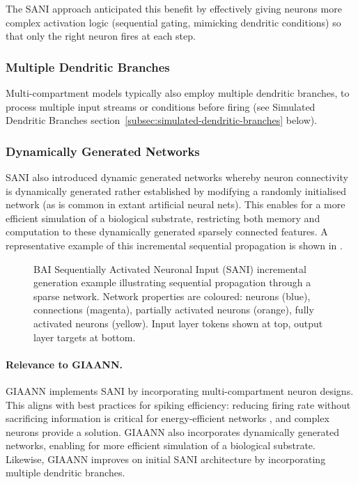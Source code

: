 The SANI approach anticipated this benefit by effectively giving neurons more complex activation logic (sequential gating, mimicking dendritic conditions) so that only the right neuron fires at each step.

\subsubsection{Multiple Dendritic Branches}

Multi-compartment models typically also employ multiple dendritic branches, to process multiple input streams or conditions before firing \citep{leugering2020spiking, leugering2023dendritic} (see Simulated Dendritic Branches section~\ref{subsec:simulated-dendritic-branches} below).

\subsubsection{Dynamically Generated Networks}

SANI also introduced dynamic generated networks \citep{bairesearch2022SANI, bairesearch2025EISANIpt} whereby neuron connectivity is dynamically generated rather established by modifying a randomly initialised network (as is common in extant artificial neural nets). This enables for a more efficient simulation of a biological substrate, restricting both memory and computation to these dynamically generated sparsely connected features.
A representative example of this incremental sequential propagation is shown in .

\begin{figure}[htbp]
\centering

\caption{BAI Sequentially Activated Neuronal Input (SANI) incremental generation example illustrating sequential propagation through a sparse network. Network properties are coloured: neurons (blue), connections (magenta), partially activated neurons (orange), fully activated neurons (yellow). Input layer tokens shown at top, output layer targets at bottom.}
\label{fig:intro-sani-sequential-propagation}
\end{figure}

\paragraph{Relevance to GIAANN.}
GIAANN implements SANI by incorporating multi-compartment neuron designs.
This aligns with best practices for spiking efficiency: reducing firing rate without sacrificing information is critical for energy-efficient networks \citep{leugering2020spiking}, and complex neurons provide a solution. GIAANN also incorporates dynamically generated networks, enabling for more efficient simulation of a biological substrate. Likewise, GIAANN improves on initial SANI architecture by incorporating multiple dendritic branches.

